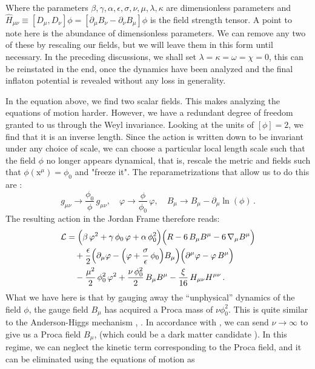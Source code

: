 \documentclass[aps,prd,reprint,preprintnumbers,showpacs,floatfix,nofootinbib,superscript address]{revtex4-2}
\begin{document}
Where the parameters ${\beta, \gamma, \alpha, \epsilon, \sigma, \nu, \mu, \lambda, \kappa}$ are dimensionless parameters and $\hat{H}_{\mu\nu} \equiv [D_\mu,D_\nu]\phi = [\partial_\mu B_\nu - \partial_\nu B_\mu]\phi$ is the field strength tensor. A point to note here is the abundance of dimensionless parameters. We can remove any two of these by rescaling our fields, but we will leave them in this form until necessary. In the preceding discussions, we shall set $\lambda = \kappa = \omega = \chi= 0$, this can be reinstated in the end, once the dynamics have been analyzed and the final inflaton potential is revealed without any loss in generality.

In the equation above, we find two scalar fields. This makes analyzing the equations of motion harder. However, we have a redundant degree of freedom granted to us through the Weyl invariance. Looking at the units of $[\phi] = 2$, we find that it is an inverse length. Since the action is written down to be invariant under any choice of scale, we can choose a particular local length scale such that the field $\phi$ no longer appears dynamical, that is, rescale the metric and fields such that $\phi(\text{x}^\mu) = \phi_0$ and "freeze it". The reparametrizations that allow us to do this are :
\[
g_{\mu \nu}\rightarrow\frac{\phi_0}{\phi}\,g_{\mu \nu},\quad 
\varphi\rightarrow\frac{\phi}{\phi_0}\,\varphi,\quad 
B_{\mu}\rightarrow B_{\mu} - \partial_{\mu}\ln(\phi)\,.
\] 
The resulting action in the Jordan Frame therefore reads:
\begin{equation}\label{29}
\begin{aligned}
\mathcal{L} &= \Bigl(\beta\, \varphi^2 + \gamma\, \phi_0\, \varphi + \alpha\, \phi_0^2\Bigr)
\Bigl(R - 6\, B_{\mu} B^{\mu} - 6\, \nabla_{\mu} B^\mu\Bigr) \\
&\quad + \frac{\epsilon}{2} \Bigl(\partial_{\mu}\varphi - \Bigl(\varphi + \frac{\sigma}{\epsilon}\,\phi_0\Bigr)B_{\mu}\Bigr)
\Bigl(\partial^{\mu}\varphi - \varphi\,B^{\mu}\Bigr) \\
&\quad - \frac{\mu^2}{2}\, \phi_0^2\,\varphi^2 
+ \frac{\nu\,\phi_0^2}{2}\,B_{\mu} B^{\mu} 
- \frac{\xi}{16}\,H_{\mu\nu} H^{\mu\nu}\,.
\end{aligned}
\end{equation}
What we have here is that by gauging away the ``unphysical'' dynamics of the field $\phi$, the gauge field $B_\mu$ has acquired a Proca mass of $\nu \phi_0^2$. This is quite similar to the Anderson-Higgs mechanism \cite{anderson_plasmons_1963}, \cite{higgs_broken_1964}. In accordance with \cite{barker2024poincaregaugetheoryconformal}, we can send $\nu \rightarrow \infty$ to give us a Proca field $B_\mu$, (which could be a dark matter candidate \cite{Lasenby_2016}). In this regime, we can neglect the kinetic term corresponding to the Proca field, and it can be eliminated using the equations of motion as
\end{document}
